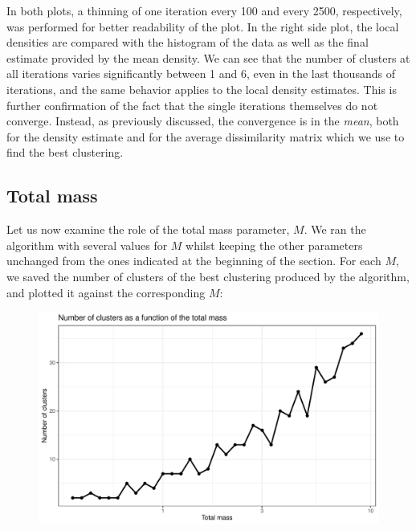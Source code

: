 In both plots, a thinning of one iteration every 100 and every 2500, respectively, was performed for better readability of the plot.
In the right side plot, the local densities are compared with the histogram of the data as well as the final estimate provided by the mean density.
We can see that the number of clusters at all iterations varies significantly between 1 and 6, even in the last thousands of iterations, and the same behavior applies to the local density estimates. 
This is further confirmation of the fact that the single iterations themselves do not converge.
Instead, as previously discussed, the convergence is in the \emph{mean}, both for the density estimate and for the average dissimilarity matrix which we use to find the best clustering.

\subsection{Total mass}
Let us now examine the role of the total mass parameter, $M$.
We ran the algorithm with several values for $M$ whilst keeping the other parameters unchanged from the ones indicated at the beginning of the section.
For each $M$, we saved the number of clusters of the best clustering produced by the algorithm, and plotted it against the corresponding $M$:
\clearpage
\begin{figure}[h]
	\centering
	\includegraphics[scale=0.55]{etc/num_clust_M.pdf}
\end{figure}

